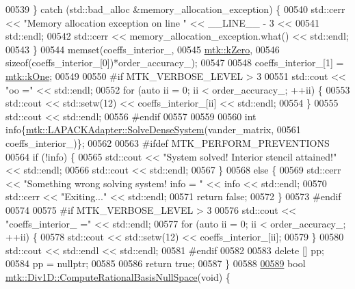 \begin{DoxyCode}
{{00539   \} \textcolor{keywordflow}{catch} (std::bad\_alloc &memory\_allocation\_exception) \{
00540     std::cerr << \textcolor{stringliteral}{"Memory allocation exception on line "} << \_\_LINE\_\_ - 3 <<
00541       std::endl;
00542     std::cerr << memory\_allocation\_exception.what() << std::endl;
00543   \}
00544   memset(coeffs\_interior\_,
00545          \hyperlink{group__c01-roots_ga59a451a5fae30d59649bcda274fea271}{mtk::kZero},
00546          \textcolor{keyword}{sizeof}(coeffs\_interior\_[0])*order\_accuracy\_);
00547 
00548   coeffs\_interior\_[1] = \hyperlink{group__c01-roots_ga26407c24d43b6b95480943340d285c71}{mtk::kOne};
00549 
00550 \textcolor{preprocessor}{  #if MTK\_VERBOSE\_LEVEL > 3}
00551   std::cout << \textcolor{stringliteral}{"oo ="} << std::endl;
00552   \textcolor{keywordflow}{for} (\textcolor{keyword}{auto} ii = 0; ii < order\_accuracy\_; ++ii) \{
00553     std::cout << std::setw(12) << coeffs\_interior\_[ii] << std::endl;
00554   \}
00555   std::cout << std::endl;
00556 \textcolor{preprocessor}{  #endif}
00557 
00559 
00560   \textcolor{keywordtype}{int} info\{\hyperlink{classmtk_1_1LAPACKAdapter_a7428bccf74fd4a4af68fb7233846da22}{mtk::LAPACKAdapter::SolveDenseSystem}(vander\_matrix,
00561                                                 coeffs\_interior\_)\};
00562 
00563 \textcolor{preprocessor}{  #ifdef MTK\_PERFORM\_PREVENTIONS}
00564   \textcolor{keywordflow}{if} (!info) \{
00565     std::cout << \textcolor{stringliteral}{"System solved! Interior stencil attained!"} << std::endl;
00566     std::cout << std::endl;
00567   \}
00568   \textcolor{keywordflow}{else} \{
00569     std::cerr << \textcolor{stringliteral}{"Something wrong solving system! info = "} << info << std::endl;
00570     std::cerr << \textcolor{stringliteral}{"Exiting..."} << std::endl;
00571     \textcolor{keywordflow}{return} \textcolor{keyword}{false};
00572   \}
00573 \textcolor{preprocessor}{  #endif}
00574 
00575 \textcolor{preprocessor}{  #if MTK\_VERBOSE\_LEVEL > 3}
00576   std::cout << \textcolor{stringliteral}{"coeffs\_interior\_ ="} << std::endl;
00577   \textcolor{keywordflow}{for} (\textcolor{keyword}{auto} ii = 0; ii < order\_accuracy\_; ++ii) \{
00578     std::cout << std::setw(12) << coeffs\_interior\_[ii];
00579   \}
00580   std::cout << std::endl << std::endl;
00581 \textcolor{preprocessor}{  #endif}
00582 
00583   \textcolor{keyword}{delete} [] pp;
00584   pp = \textcolor{keyword}{nullptr};
00585 
00586   \textcolor{keywordflow}{return} \textcolor{keyword}{true};
00587 \}
00588 
\hypertarget{mtk__div__1d_8cc_source_l00589}{}\hyperlink{classmtk_1_1Div1D_aa0c0c278b2c00a29c1ceaa70d31aebab}{00589} \textcolor{keywordtype}{bool} \hyperlink{classmtk_1_1Div1D_aa0c0c278b2c00a29c1ceaa70d31aebab}{mtk::Div1D::ComputeRationalBasisNullSpace}(\textcolor{keywordtype}{void}) \{
}}
\end{DoxyCode}
